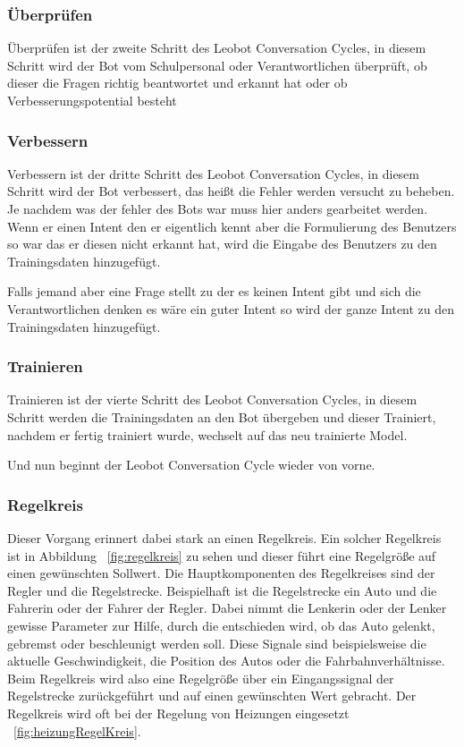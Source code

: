 \subsubsection{Überprüfen}

Überprüfen ist der zweite Schritt des Leobot Conversation Cycles, in diesem Schritt wird der Bot vom Schulpersonal oder Verantwortlichen überprüft, ob dieser die Fragen richtig beantwortet und erkannt hat oder ob Verbesserungspotential besteht

\subsubsection{Verbessern}
Verbessern ist der dritte Schritt des Leobot Conversation Cycles, in diesem Schritt wird der Bot verbessert, das heißt die Fehler werden versucht zu beheben.
Je nachdem was der fehler des Bots war muss hier anders gearbeitet werden.
Wenn er einen Intent den er eigentlich kennt aber die Formulierung des Benutzers so war das er diesen nicht erkannt hat, wird die Eingabe des Benutzers zu den Trainingsdaten hinzugefügt.

Falls jemand aber eine Frage stellt zu der es keinen Intent gibt und sich die Verantwortlichen denken es wäre ein guter Intent so wird der ganze Intent zu den Trainingsdaten hinzugefügt.

\subsubsection{Trainieren}
Trainieren ist der vierte Schritt des Leobot Conversation Cycles, in diesem Schritt werden die Trainingsdaten an den Bot übergeben und dieser Trainiert, nachdem er fertig trainiert wurde, wechselt auf das neu trainierte Model.

Und nun beginnt der Leobot Conversation Cycle wieder von vorne.

\subsubsection{Regelkreis}

Dieser Vorgang erinnert dabei stark an einen Regelkreis.
Ein solcher Regelkreis ist in Abbildung ~\ref{fig:regelkreis} zu sehen und dieser führt eine Regelgröße auf einen gewünschten Sollwert.
Die Hauptkomponenten des Regelkreises sind der Regler und die Regelstrecke.
Beispielhaft ist die Regelstrecke ein Auto und die Fahrerin oder der Fahrer der Regler.
Dabei nimmt die Lenkerin oder der Lenker gewisse Parameter zur Hilfe, durch die entschieden wird, ob das Auto gelenkt, gebremst oder beschleunigt werden soll.
Diese Signale sind beispielsweise die aktuelle Geschwindigkeit, die Position des Autos oder die Fahrbahnverhältnisse.
Beim Regelkreis wird also eine Regelgröße über ein Eingangssignal der Regelstrecke zurückgeführt und auf einen gewünschten Wert gebracht.
Der Regelkreis wird oft bei der Regelung von Heizungen eingesetzt ~\ref{fig:heizungRegelKreis}.\cite{regelkreis, regelkreisBeispiel}


